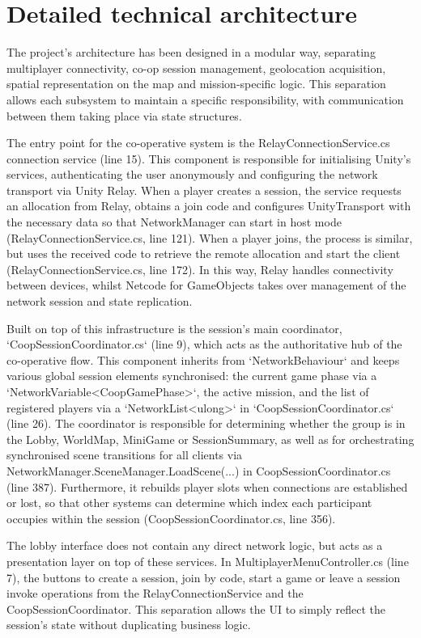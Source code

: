 \section{Detailed technical architecture}
\label{sec:detailed-technical-architecture}
The project’s architecture has been designed in a modular way, separating multiplayer connectivity, co-op session management, geolocation acquisition, spatial representation on the map and mission-specific logic. This separation allows each subsystem to maintain a specific responsibility, with communication between them taking place via state structures.

The entry point for the co-operative system is the RelayConnectionService.cs connection service (line 15). This component is responsible for initialising Unity’s services, authenticating the user anonymously and configuring the network transport via Unity Relay. When a player creates a session, the service requests an allocation from Relay, obtains a join code and configures UnityTransport with the necessary data so that NetworkManager can start in host mode (RelayConnectionService.cs, line 121). When a player joins, the process is similar, but uses the received code to retrieve the remote allocation and start the client (RelayConnectionService.cs, line 172). In this way, Relay handles connectivity between devices, whilst Netcode for GameObjects takes over management of the network session and state replication.

Built on top of this infrastructure is the session’s main coordinator, `CoopSessionCoordinator.cs` (line 9), which acts as the authoritative hub of the co-operative flow. This component inherits from `NetworkBehaviour` and keeps various global session elements synchronised: the current game phase via a `NetworkVariable<CoopGamePhase>`, the active mission, and the list of registered players via a `NetworkList<ulong>` in `CoopSessionCoordinator.cs` (line 26). The coordinator is responsible for determining whether the group is in the Lobby, WorldMap, MiniGame or SessionSummary, as well as for orchestrating synchronised scene transitions for all clients via NetworkManager.SceneManager.LoadScene(...) in CoopSessionCoordinator.cs (line 387). Furthermore, it rebuilds player slots when connections are established or lost, so that other systems can determine which index each participant occupies within the session (CoopSessionCoordinator.cs, line 356).

The lobby interface does not contain any direct network logic, but acts as a presentation layer on top of these services. In MultiplayerMenuController.cs (line 7), the buttons to create a session, join by code, start a game or leave a session invoke operations from the RelayConnectionService and the CoopSessionCoordinator. This separation allows the UI to simply reflect the session’s state without duplicating business logic.

